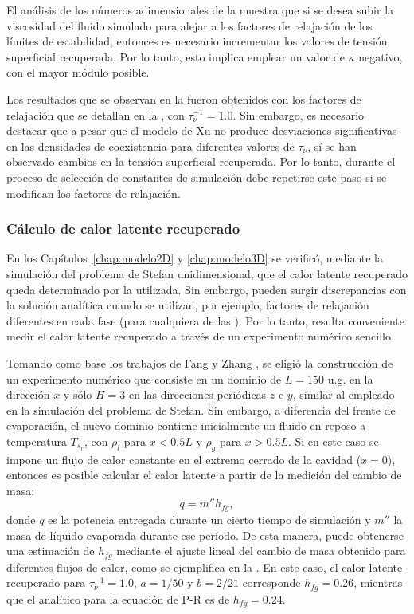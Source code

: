 El an\'alisis de los n\'umeros adimensionales de la  muestra que si se desea subir la viscosidad del fluido simulado para alejar a los factores de relajaci\'on de los l\'imites de estabilidad, entonces es necesario incrementar los valores de tensi\'on superficial recuperada. Por lo tanto, esto implica emplear un valor de $\kappa$ negativo, con el mayor m\'odulo posible. 

Los resultados que se observan en la  fueron obtenidos con los factores de relajaci\'on que se detallan en la , con $\tau_{\nu}^{-1}=1.0$. Sin embargo, es necesario destacar que a pesar que el modelo de Xu no produce desviaciones significativas en las densidades de coexistencia para diferentes valores de $\tau_{\nu}$, s\'i se han observado cambios en la tensi\'on superficial recuperada. Por lo tanto, durante el proceso de selecci\'on de constantes de simulaci\'on debe repetirse este paso si se modifican los factores de relajaci\'on.


\subsubsection{C\'alculo de calor latente recuperado}

En los Cap\'itulos~\ref{chap:modelo2D} y \ref{chap:modelo3D} se verific\'o, mediante la simulaci\'on del problema de Stefan unidimensional, que el calor latente recuperado queda determinado por la \eos{} utilizada. Sin embargo, pueden surgir discrepancias con la soluci\'on anal\'itica cuando se utilizan, por ejemplo, factores de relajaci\'on  diferentes en cada fase (para cualquiera de las \lbe{}). Por lo tanto, resulta conveniente medir el calor latente recuperado a trav\'es de un experimento num\'erico sencillo.

Tomando como base los trabajos de Fang \cite{fang_lattice_2017} y Zhang \cite{zhang_simulation_2015}, se eligi\'o la construcci\'on de un experimento num\'erico que consiste en un dominio de $L=150$ u.g. en la direcci\'on $x$ y s\'olo $H=3$ en las direcciones peri\'odicas $z$ e $y$, similar al empleado en la simulaci\'on del problema de Stefan. Sin embargo, a diferencia del frente de evaporaci\'on, el nuevo dominio contiene inicialmente un fluido en reposo a temperatura $T_{s_r}$, con $\rho_l$ para $x<0.5L$ y $\rho_g$ para $x>0.5L$. Si en este caso se impone un flujo de calor constante en el extremo cerrado de la cavidad ($x=0$), entonces es posible calcular el calor latente a partir de la medici\'on del cambio de masa:
\begin{equation}
	q = m'' h_{fg},
\end{equation}
donde $q$ es la potencia entregada durante un cierto tiempo de simulaci\'on y $m''$ la masa de l\'iquido evaporada durante ese per\'iodo. De esta manera, puede obtenerse una estimaci\'on de $h_{fg}$ mediante el ajuste lineal del cambio de masa obtenido para diferentes flujos de calor, como se ejemplifica en la . En este caso, el calor latente recuperado para $\tau_{\nu}^{-1}=1.0$, $a=1/50$ y $b=2/21$ corresponde $h_{fg}=0.26$, mientras que el anal\'itico para la ecuaci\'on de P-R \cite{peng_new_1976} es de $h_{fg}=0.24$.

